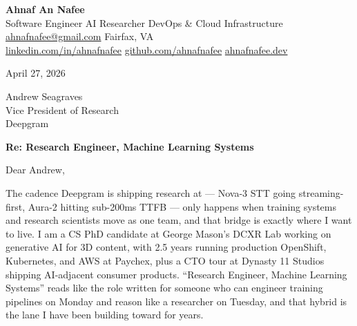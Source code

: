 \documentclass[letterpaper,11pt]{article}
\begin{document}
\begin{center}
  {\LARGE\bfseries\color{accent} Ahnaf An Nafee }\\[3pt]
  {\small Software Engineer \textbar{} AI Researcher \textbar{} DevOps \& Cloud Infrastructure }\\[4pt]
  \small
  \href{mailto:ahnafnafee@gmail.com}{ahnafnafee@gmail.com} \textbar{}
  Fairfax, VA\\
  \href{https://linkedin.com/in/ahnafnafee}{linkedin.com/in/ahnafnafee} \textbar{}
  \href{https://github.com/ahnafnafee}{github.com/ahnafnafee} \textbar{}
  \href{https://www.ahnafnafee.dev}{ahnafnafee.dev}
\end{center}

\vspace{20pt}

April 27, 2026

Andrew Seagraves\\Vice President of Research\\Deepgram

\textbf{Re: Research Engineer, Machine Learning Systems}

Dear Andrew,

The cadence Deepgram is shipping research at --- Nova-3 STT going streaming-first, Aura-2 hitting sub-200ms TTFB --- only happens when training systems and research scientists move as one team, and that bridge is exactly where I want to live. I am a CS PhD candidate at George Mason's DCXR Lab working on generative AI for 3D content, with 2.5 years running production OpenShift, Kubernetes, and AWS at Paychex, plus a CTO tour at Dynasty 11 Studios shipping AI-adjacent consumer products. ``Research Engineer, Machine Learning Systems'' reads like the role written for someone who can engineer training pipelines on Monday and reason like a researcher on Tuesday, and that hybrid is the lane I have been building toward for years.
\end{document}
